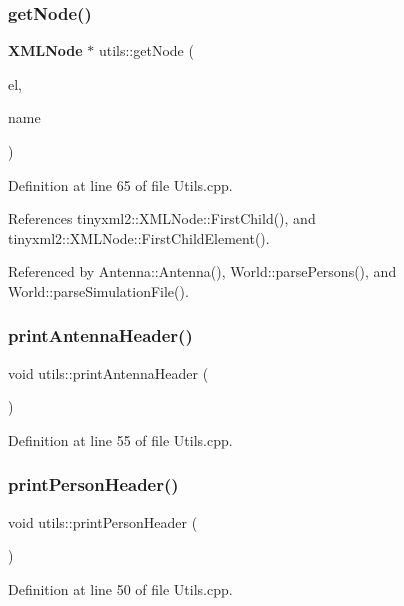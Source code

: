 \subsubsection{getNode()}
{\footnotesize\ttfamily \textbf{ X\+M\+L\+Node} $\ast$ utils\+::get\+Node (\begin{DoxyParamCaption}\item[{\textbf{ X\+M\+L\+Element} $\ast$}]{el,  }\item[{const char $\ast$}]{name }\end{DoxyParamCaption})}



Definition at line 65 of file Utils.\+cpp.



References tinyxml2\+::\+X\+M\+L\+Node\+::\+First\+Child(), and tinyxml2\+::\+X\+M\+L\+Node\+::\+First\+Child\+Element().



Referenced by Antenna\+::\+Antenna(), World\+::parse\+Persons(), and World\+::parse\+Simulation\+File().

\mbox{\label{namespaceutils_a2080e7db5afc5bb1b4c9ef5336f78ccb}} 
\subsubsection{printAntennaHeader()}
{\footnotesize\ttfamily void utils\+::print\+Antenna\+Header (\begin{DoxyParamCaption}{ }\end{DoxyParamCaption})}



Definition at line 55 of file Utils.\+cpp.

\mbox{\label{namespaceutils_a1978a6ccb2360773215aba027d8b6f08}} 
\subsubsection{printPersonHeader()}
{\footnotesize\ttfamily void utils\+::print\+Person\+Header (\begin{DoxyParamCaption}{ }\end{DoxyParamCaption})}



Definition at line 50 of file Utils.\+cpp.


